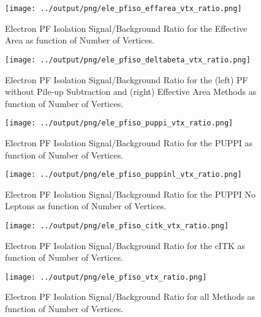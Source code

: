 \documentclass[11pt]{book}
\begin{document}
\begin{figure}[htb]
\centering
\texttt{[image: ../output/png/ele\_pfiso\_effarea\_vtx\_ratio.png]}
\caption{Electron PF Isolation Signal/Background Ratio for the Effective Area as function of Number of Vertices.}
\label{fig:ele_pfiso_vtx_ratio_effarea}
\end{figure}

\begin{figure}[htb]
\centering
\texttt{[image: ../output/png/ele\_pfiso\_deltabeta\_vtx\_ratio.png]}
\caption{Electron PF Isolation Signal/Background Ratio for the (left) PF without Pile-up Subtraction and (right) Effective Area Methods as function of Number of Vertices.}
\label{fig:ele_pfiso_vtx_ratio_deltabeta}
\end{figure}

\begin{figure}[htb]
\centering
\texttt{[image: ../output/png/ele\_pfiso\_puppi\_vtx\_ratio.png]}
\caption{Electron PF Isolation Signal/Background Ratio for the PUPPI as function of Number of Vertices.}
\label{fig:ele_pfiso_vtx_ratio_puppi}
\end{figure}

\begin{figure}[htb]
\centering
\texttt{[image: ../output/png/ele\_pfiso\_puppinl\_vtx\_ratio.png]}
\caption{Electron PF Isolation Signal/Background Ratio for the PUPPI No Leptons as function of Number of Vertices.}
\label{fig:ele_pfiso_vtx_ratio_puppinl}
\end{figure}

\begin{figure}[htb]
\centering
\texttt{[image: ../output/png/ele\_pfiso\_citk\_vtx\_ratio.png]}
\caption{Electron PF Isolation Signal/Background Ratio for the cITK as function of Number of Vertices.}
\label{fig:ele_pfiso_vtx_ratio_citk}
\end{figure}

\begin{figure}[htb]
\centering
\texttt{[image: ../output/png/ele\_pfiso\_vtx\_ratio.png]}
\caption{Electron PF Isolation Signal/Background Ratio for all Methods as function of Number of Vertices.}
\label{fig:ele_pfiso_vtx_ratio}
\end{figure}
\clearpage


\end{document}
